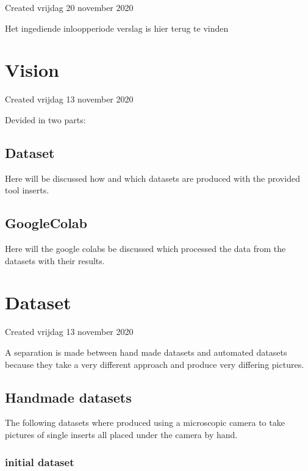 \documentclass{article}
\begin{document}
Created vrijdag 20 november 2020



Het ingediende inloopperiode verslag is hier terug te vinden




		\section{Vision}

Created vrijdag 13 november 2020



Devided in two parts:



\subsection{Dataset}

Here will be discussed how and which datasets are produced with the provided tool inserts. 



\subsection{GoogleColab}

Here will the google colabs be discussed which processed the data from the datasets with their results.


		\section{Dataset}

Created vrijdag 13 november 2020



A separation is made between hand made datasets and automated datasets because they take a very different approach and produce very differing pictures.



\subsection{Handmade datasets}

The following datasets where produced using a microscopic camera to take pictures of single inserts all placed under the camera by hand.



\subsubsection{initial dataset}
\end{document}
